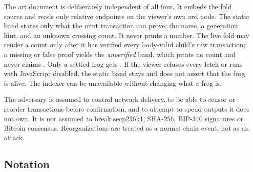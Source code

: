 The art document is deliberately independent of all four. It embeds the fold
source and reads only relative endpoints on the viewer's own ord node. The
static band states only what the mint transaction can prove: the name, a
generation hint, and an unknown crossing count. It never prints a number.
The live fold may render a count only after it has verified every body-valid
child's raw transaction; a missing or false proof yields the
\emph{unverified} band, which prints no count and never claims .
Only a settled frog gets . If the viewer refuses every fetch or
runs with JavaScript disabled, the static band stays and does not assert that
the frog is alive. The indexer can be unavailable without changing what a
frog is.

The adversary is assumed to control network delivery, to be able to censor or
reorder transactions before confirmation, and to attempt to spend outputs it
does not own. It is not assumed to break secp256k1, SHA-256, BIP-340
signatures or Bitcoin consensus. Reorganizations are treated as a normal
chain event, not as an attack.

\subsection{Notation}

